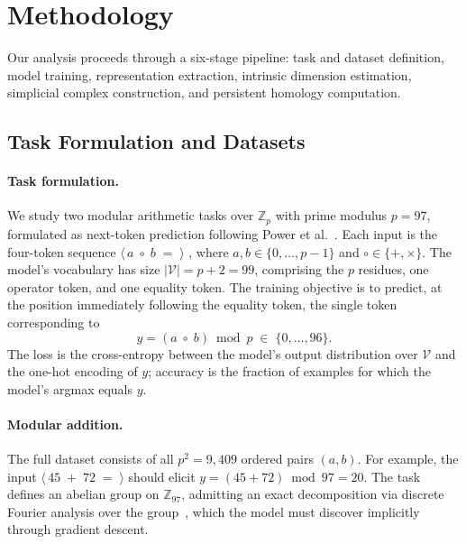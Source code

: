 \section{Methodology}
\label{sec:methodology}

Our analysis proceeds through a six-stage pipeline: task and dataset
definition, model training, representation extraction, intrinsic dimension
estimation, simplicial complex construction, and persistent homology
computation. 

\subsection{Task Formulation and Datasets}
\label{subsec:dataset}

\paragraph{Task formulation.}
We study two modular arithmetic tasks over $\mathbb{Z}_p$ with prime
modulus $p = 97$, formulated as next-token prediction following
Power et al.~\cite{GrokkingOpenAI}. Each input is the four-token
sequence $
    \langle\, a \;\circ\; b \;=\; \rangle$ ,
where $a, b \in \{0, \ldots, p-1\}$ and $\circ \in \{+, \times\}$.
The model's vocabulary has size $|\mathcal{V}| = p + 2 = 99$,
comprising the $p$ residues, one operator token, and one equality token.
The training objective is to predict, at the position immediately
following the equality token, the single token corresponding to
\begin{equation}
    y = (a \;\circ\; b) \bmod p \;\in\; \{0, \ldots, 96\}.
    \label{eq:target}
\end{equation}
The loss is the cross-entropy between the model's output distribution
over $\mathcal{V}$ and the one-hot encoding of $y$; accuracy is the
fraction of examples for which the model's argmax equals $y$.

\paragraph{Modular addition.}
The full dataset consists of all $p^2 = 9{,}409$ ordered pairs $(a,b)$.
For example, the input $\langle\,45\;+\;72\;=\;\rangle$ should elicit
$y = (45 + 72) \bmod 97 = 20$. The task defines an abelian group on
$\mathbb{Z}_{97}$, admitting an exact decomposition via discrete Fourier
analysis over the group~\cite{nanda2023progressmeasuresgrokkingmechanistic}, which the model must
discover implicitly through gradient descent.

